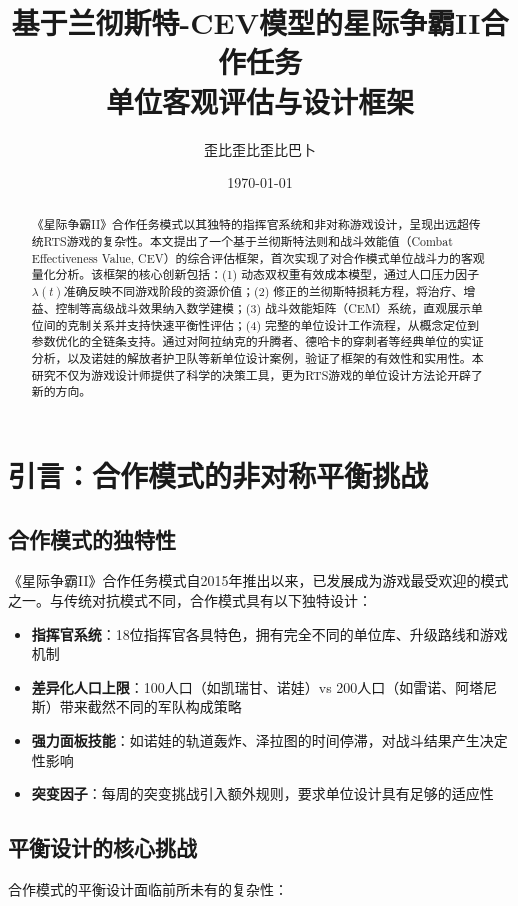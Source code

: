\documentclass[a4paper,12pt]{article}
\title{\textbf{基于兰彻斯特-CEV模型的星际争霸II合作任务\\单位客观评估与设计框架}}
\author{歪比歪比歪比巴卜}
\date{\today}
\begin{document}
\maketitle

\begin{abstract}
\noindent
《星际争霸II》合作任务模式以其独特的指挥官系统和非对称游戏设计，呈现出远超传统RTS游戏的复杂性。本文提出了一个基于兰彻斯特法则和战斗效能值（Combat Effectiveness Value, CEV）的综合评估框架，首次实现了对合作模式单位战斗力的客观量化分析。该框架的核心创新包括：(1) 动态双权重有效成本模型，通过人口压力因子$\lambda(t)$准确反映不同游戏阶段的资源价值；(2) 修正的兰彻斯特损耗方程，将治疗、增益、控制等高级战斗效果纳入数学建模；(3) 战斗效能矩阵（CEM）系统，直观展示单位间的克制关系并支持快速平衡性评估；(4) 完整的单位设计工作流程，从概念定位到参数优化的全链条支持。通过对阿拉纳克的升腾者、德哈卡的穿刺者等经典单位的实证分析，以及诺娃的解放者护卫队等新单位设计案例，验证了框架的有效性和实用性。本研究不仅为游戏设计师提供了科学的决策工具，更为RTS游戏的单位设计方法论开辟了新的方向。
\end{abstract}

\tableofcontents
\newpage

\section{引言：合作模式的非对称平衡挑战}

\subsection{合作模式的独特性}
《星际争霸II》合作任务模式自2015年推出以来，已发展成为游戏最受欢迎的模式之一。与传统对抗模式不同，合作模式具有以下独特设计：

\begin{itemize}
\item \textbf{指挥官系统}：18位指挥官各具特色，拥有完全不同的单位库、升级路线和游戏机制
\item \textbf{差异化人口上限}：100人口（如凯瑞甘、诺娃）vs 200人口（如雷诺、阿塔尼斯）带来截然不同的军队构成策略
\item \textbf{强力面板技能}：如诺娃的轨道轰炸、泽拉图的时间停滞，对战斗结果产生决定性影响
\item \textbf{突变因子}：每周的突变挑战引入额外规则，要求单位设计具有足够的适应性
\end{itemize}

\subsection{平衡设计的核心挑战}
合作模式的平衡设计面临前所未有的复杂性：
\end{document}
